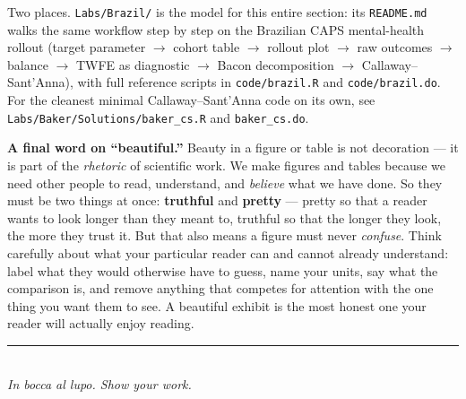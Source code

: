 \documentclass[11pt,a4paper]{article}
\newcommand{\code}[1]{\texttt{\color{ChiantiRed}#1}}
\begin{document}
\begin{helpbox}
Two places. \code{Labs/Brazil/} is the model for this entire section: its \code{README.md} walks the same workflow step by step on the Brazilian CAPS mental-health rollout (target parameter $\to$ cohort table $\to$ rollout plot $\to$ raw outcomes $\to$ balance $\to$ TWFE as diagnostic $\to$ Bacon decomposition $\to$ Callaway--Sant'Anna), with full reference scripts in \code{code/brazil.R} and \code{code/brazil.do}. For the cleanest minimal Callaway--Sant'Anna code on its own, see \code{Labs/Baker/Solutions/baker\_cs.R} and \code{baker\_cs.do}.
\end{helpbox}

\vspace{1.0em}
\begin{beautybox}
\textbf{A final word on ``beautiful.''} Beauty in a figure or table is not decoration --- it is part of the \emph{rhetoric} of scientific work. We make figures and tables because we need other people to read, understand, and \emph{believe} what we have done. So they must be two things at once: \textbf{truthful} and \textbf{pretty} --- pretty so that a reader wants to look longer than they meant to, truthful so that the longer they look, the more they trust it. But that also means a figure must never \emph{confuse}. Think carefully about what your particular reader can and cannot already understand: label what they would otherwise have to guess, name your units, say what the comparison is, and remove anything that competes for attention with the one thing you want them to see. A beautiful exhibit is the most honest one your reader will actually enjoy reading.
\end{beautybox}

\vspace{0.5em}
\begin{center}
{\color{Terracotta}\rule{0.55\textwidth}{1.1pt}}\\[0.6em]
{\itshape\color{OldMortar} In bocca al lupo. Show your work.}
\end{center}
\end{document}
